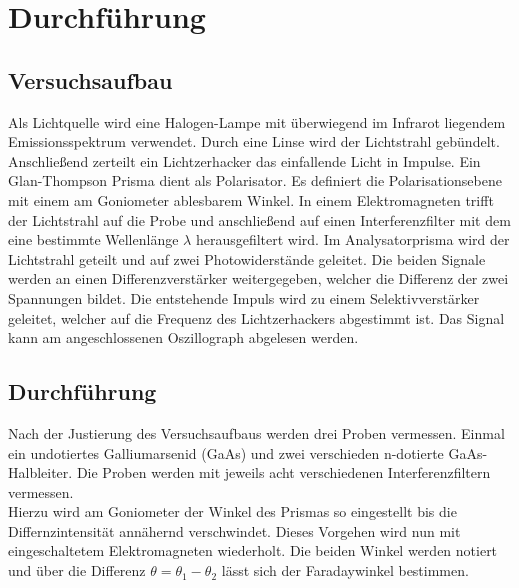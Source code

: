 \section{Durchführung}
\label{sec:Durchführung}
\subsection{Versuchsaufbau}
Als Lichtquelle wird eine Halogen-Lampe mit überwiegend im Infrarot liegendem Emissionsspektrum verwendet.
Durch eine Linse wird der Lichtstrahl gebündelt.
Anschließend zerteilt ein Lichtzerhacker das einfallende Licht in Impulse.
Ein Glan-Thompson Prisma dient als Polarisator. Es definiert die Polarisationsebene mit einem am Goniometer ablesbarem
Winkel. In einem Elektromagneten trifft der Lichtstrahl auf die Probe und anschließend auf einen
Interferenzfilter mit dem eine bestimmte Wellenlänge $\lambda$ herausgefiltert wird.
Im Analysatorprisma wird der Lichtstrahl geteilt und auf zwei Photowiderstände
geleitet. Die beiden Signale werden an einen Differenzverstärker weitergegeben,
welcher die Differenz der zwei Spannungen bildet. Die entstehende Impuls wird zu einem Selektivverstärker geleitet,
welcher auf die Frequenz des Lichtzerhackers abgestimmt ist.
Das Signal kann am angeschlossenen Oszillograph abgelesen werden.
\subsection{Durchführung}
Nach der Justierung des Versuchsaufbaus werden drei Proben vermessen. Einmal ein undotiertes
Galliumarsenid (GaAs) und zwei verschieden n-dotierte GaAs-Halbleiter. Die Proben werden mit jeweils
acht verschiedenen Interferenzfiltern vermessen.\\
Hierzu wird am Goniometer der Winkel des Prismas so eingestellt bis die Differnzintensität annähernd
verschwindet. Dieses Vorgehen wird nun mit eingeschaltetem Elektromagneten wiederholt.
Die beiden Winkel werden notiert und über die Differenz $\theta=\theta_1-\theta_2$ lässt sich der Faradaywinkel bestimmen.

